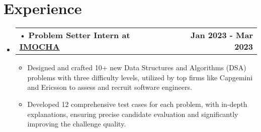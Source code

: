 \documentclass[letterpaper,11pt]{article}
\makeatletter
\newcommand{\resumeItem}[1]{
  \item\small{
	{#1 \vspace{-2pt}}
  }
}
\newcommand{\resumeProjectHeading}[2]{
	\item
	\begin{tabular*}{1.001\textwidth}{l@{\extracolsep{\fill}}r}
  	\small#1 & \textbf{\small #2}\\
	\end{tabular*}\vspace{-7pt}
}
\newcommand{\resumeSubHeadingListStart}{\begin{itemize}[leftmargin=0.0in, label={}]}
\newcommand{\resumeSubHeadingListEnd}{\end{itemize}}
\newcommand{\resumeItemListStart}{\begin{itemize}}
\newcommand{\resumeItemListEnd}{\end{itemize}\vspace{-5pt}}
\makeatother
\begin{document}
 
\section{Experience }
\begin{itemize}[leftmargin=0.12in, label={}]
	\vspace{-12pt}
	\resumeSubHeadingListStart
 
      \resumeProjectHeading
       {\hspace{-5pt}• { \textbf{Problem Setter Intern at \href{https://www.imocha.io/}{IMOCHA}} }  }{Jan 2023 - Mar 2023}
      	\resumeItemListStart
             \vspace{5pt}
        	\resumeItem{ Designed and crafted 10+ new Data Structures and Algorithms (DSA) problems with three difficulty levels, utilized by top firms like Capgemini and Ericsson to assess and recruit software engineers.}
             \vspace{3pt}
             
            \resumeItem{ Developed 12 comprehensive test cases for each problem, with in-depth explanations, ensuring precise candidate evaluation and significantly improving the challenge quality.}
      	\resumeItemListEnd
        \vspace{-4pt}
	\resumeSubHeadingListEnd
 \end{itemize} 
\vspace{-7pt}



\end{document}
